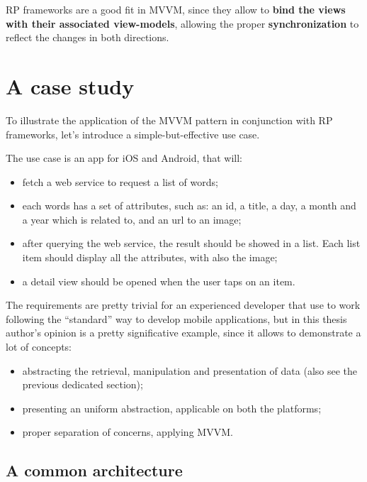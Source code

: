 RP frameworks are a good fit in MVVM, since they allow to \textbf{bind
the views with their associated view-models}, allowing the proper
\textbf{synchronization} to reflect the changes in both directions.

\section{A case study}\label{a-case-study}

To illustrate the application of the MVVM pattern in conjunction with RP
frameworks, let's introduce a simple-but-effective use case.

The use case is an app for iOS and Android, that will:

\begin{itemize}
\itemsep1pt\parskip0pt
\item
  fetch a web service to request a list of words;
\item
  each words has a set of attributes, such as: an id, a title, a day, a
  month and a year which is related to, and an url to an image;
\item
  after querying the web service, the result should be showed in a list.
  Each list item should display all the attributes, with also the image;
\item
  a detail view should be opened when the user taps on an item.
\end{itemize}

The requirements are pretty trivial for an experienced developer that
use to work following the ``standard'' way to develop mobile
applications, but in this thesis author's opinion is a pretty
significative example, since it allows to demonstrate a lot of concepts:

\begin{itemize}
\itemsep1pt\parskip0pt
\item
  abstracting the retrieval, manipulation and presentation of data (also
  see the previous dedicated section);
\item
  presenting an uniform abstraction, applicable on both the platforms;
\item
  proper separation of concerns, applying MVVM.
\end{itemize}


\subsection{A common architecture}\label{a-common-architecture}

